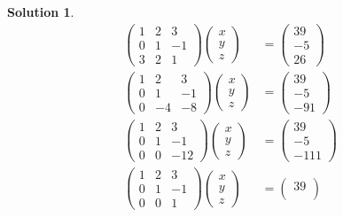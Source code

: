 \documentclass{article}
\newtheorem*{solution}{Solution}
\begin{document}
\begin{solution}
\begin{align*}
\begin{pmatrix}
1 & 2 & 3 \\
0 & 1 & -1 \\
3 & 2 & 1
\end{pmatrix}
\begin{pmatrix}
x \\ 
y \\
z
\end{pmatrix}
&=
\begin{pmatrix}
39 \\
-5 \\
26
\end{pmatrix}
\\
\begin{pmatrix}
1 & 2 & 3 \\
0 & 1 & -1 \\
0 & -4 & -8
\end{pmatrix}
\begin{pmatrix}
x \\ 
y \\
z
\end{pmatrix}
&=
\begin{pmatrix}
39 \\
-5 \\
-91
\end{pmatrix}
\\
\begin{pmatrix}
1 & 2 & 3 \\
0 & 1 & -1 \\
0 & 0 & -12
\end{pmatrix}
\begin{pmatrix}
x \\ 
y \\
z
\end{pmatrix}
&=
\begin{pmatrix}
39 \\
-5 \\
-111
\end{pmatrix}
\\
\begin{pmatrix}
1 & 2 & 3 \\
0 & 1 & -1 \\
0 & 0 & 1
\end{pmatrix}
\begin{pmatrix}
x \\ 
y \\
z
\end{pmatrix}
&=
\begin{pmatrix}
39 \\

\end{pmatrix}
\end{align*}
\end{solution}
\end{document}
